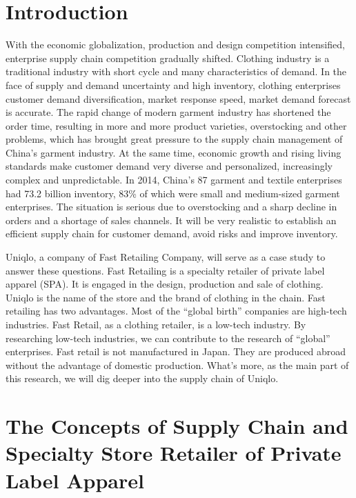 \documentclass[12pt,]{article}
\begin{document}
\newpage

\hypertarget{introduction}{%
\section{Introduction}\label{introduction}}

With the economic globalization, production and design competition
intensified, enterprise supply chain competition gradually shifted.
Clothing industry is a traditional industry with short cycle and many
characteristics of demand. In the face of supply and demand uncertainty
and high inventory, clothing enterprises customer demand
diversification, market response speed, market demand forecast is
accurate. The rapid change of modern garment industry has shortened the
order time, resulting in more and more product varieties, overstocking
and other problems, which has brought great pressure to the supply chain
management of China's garment industry. At the same time, economic
growth and rising living standards make customer demand very diverse and
personalized, increasingly complex and unpredictable. In 2014, China's
87 garment and textile enterprises had 73.2 billion inventory, 83\% of
which were small and medium-sized garment enterprises. The situation is
serious due to overstocking and a sharp decline in orders and a shortage
of sales channels. It will be very realistic to establish an efficient
supply chain for customer demand, avoid risks and improve inventory.

Uniqlo, a company of Fast Retailing Company, will serve as a case study
to answer these questions. Fast Retailing is a specialty retailer of
private label apparel (SPA). It is engaged in the design, production and
sale of clothing. Uniqlo is the name of the store and the brand of
clothing in the chain. Fast retailing has two advantages. Most of the
``global birth'' companies are high-tech industries. Fast Retail, as a
clothing retailer, is a low-tech industry. By researching low-tech
industries, we can contribute to the research of ``global'' enterprises.
Fast retail is not manufactured in Japan. They are produced abroad
without the advantage of domestic production. What's more, as the main
part of this research, we will dig deeper into the supply chain of
Uniqlo.

\hypertarget{the-concepts-of-supply-chain-and-specialty-store-retailer-of-private-label-apparel}{%
\section{The Concepts of Supply Chain and Specialty Store Retailer of
Private Label
Apparel}\label{the-concepts-of-supply-chain-and-specialty-store-retailer-of-private-label-apparel}}
\end{document}
